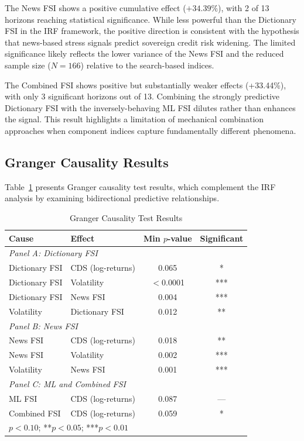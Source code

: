 The News FSI shows a positive cumulative effect ($+34.39\%$), with 2 of 13 horizons reaching statistical significance. While less powerful than the Dictionary FSI in the IRF framework, the positive direction is consistent with the hypothesis that news-based stress signals predict sovereign credit risk widening. The limited significance likely reflects the lower variance of the News FSI and the reduced sample size ($N = 166$) relative to the search-based indices.

The Combined FSI shows positive but substantially weaker effects (+33.44\%), with only 3 significant horizons out of 13. Combining the strongly predictive Dictionary FSI with the inversely-behaving ML FSI dilutes rather than enhances the signal. This result highlights a limitation of mechanical combination approaches when component indices capture fundamentally different phenomena.

\subsection{Granger Causality Results}

Table~\ref{tab:granger} presents Granger causality test results, which complement the IRF analysis by examining bidirectional predictive relationships.

\begin{table}[htbp]
\centering
\caption{Granger Causality Test Results}\label{tab:granger}
\begin{tabular}{llcc}
\hline
Cause & Effect & Min $p$-value & Significant \\
\hline
\multicolumn{4}{l}{\textit{Panel A: Dictionary FSI}} \\
Dictionary FSI & CDS (log-returns) & 0.065 & * \\
Dictionary FSI & Volatility & $<$0.0001 & *** \\
Dictionary FSI & News FSI & 0.004 & *** \\
Volatility & Dictionary FSI & 0.012 & ** \\
\hline
\multicolumn{4}{l}{\textit{Panel B: News FSI}} \\
News FSI & CDS (log-returns) & 0.018 & ** \\
News FSI & Volatility & 0.002 & *** \\
Volatility & News FSI & 0.001 & *** \\
\hline
\multicolumn{4}{l}{\textit{Panel C: ML and Combined FSI}} \\
ML FSI & CDS (log-returns) & 0.087 & --- \\
Combined FSI & CDS (log-returns) & 0.059 & * \\
\hline
\multicolumn{4}{l}{\small *$p<0.10$; **$p<0.05$; ***$p<0.01$}
\end{tabular}
\end{table}

